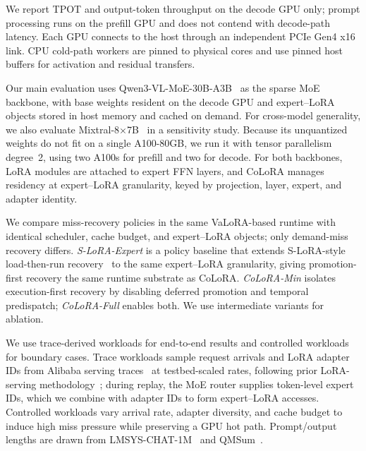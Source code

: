 \documentclass[sigplan,anonymous,review,10pt]{acmart}
\begin{document}
We report TPOT and output-token throughput on the decode GPU only; prompt processing runs on the prefill GPU and does not contend with decode-path latency. Each GPU connects to the host through an independent PCIe Gen4 x16 link. CPU cold-path workers are pinned to physical cores and use pinned host buffers for activation and residual transfers.

Our main evaluation uses Qwen3-VL-MoE-30B-A3B~\cite{qwen3technicalreport} as the sparse MoE backbone, with base weights resident on the decode GPU and expert--LoRA objects stored in host memory and cached on demand. For cross-model generality, we also evaluate Mixtral-8$\times$7B~\cite{jiang2024mixtral} in a sensitivity study. Because its unquantized weights do not fit on a single A100-80GB, we run it with tensor parallelism degree~2, using two A100s for prefill and two for decode. For both backbones, LoRA modules are attached to expert FFN layers, and CoLoRA manages residency at expert--LoRA granularity, keyed by projection, layer, expert, and adapter identity.

We compare miss-recovery policies in the same VaLoRA-based runtime with identical scheduler, cache budget, and expert--LoRA objects; only demand-miss recovery differs. {\em S-LoRA-Expert} is a policy baseline that extends S-LoRA-style load-then-run recovery~\cite{sheng2024slora} to the same expert--LoRA granularity, giving promotion-first recovery the same runtime substrate as CoLoRA. {\em CoLoRA-Min} isolates execution-first recovery by disabling deferred promotion and temporal predispatch; {\em CoLoRA-Full} enables both. We use intermediate variants for ablation.

We use trace-derived workloads for end-to-end results and controlled workloads for boundary cases. Trace workloads sample request arrivals and LoRA adapter IDs from Alibaba serving traces~\cite{yan2026FlexPipe,gentd26} at testbed-scaled rates, following prior LoRA-serving methodology~\cite{mi2025empower}; during replay, the MoE router supplies token-level expert IDs, which we combine with adapter IDs to form expert--LoRA accesses. Controlled workloads vary arrival rate, adapter diversity, and cache budget to induce high miss pressure while preserving a GPU hot path. Prompt/output lengths are drawn from LMSYS-CHAT-1M~\cite{zheng2023lmsyschat1m} and QMSum~\cite{zhong2021qmsum}.
\end{document}
